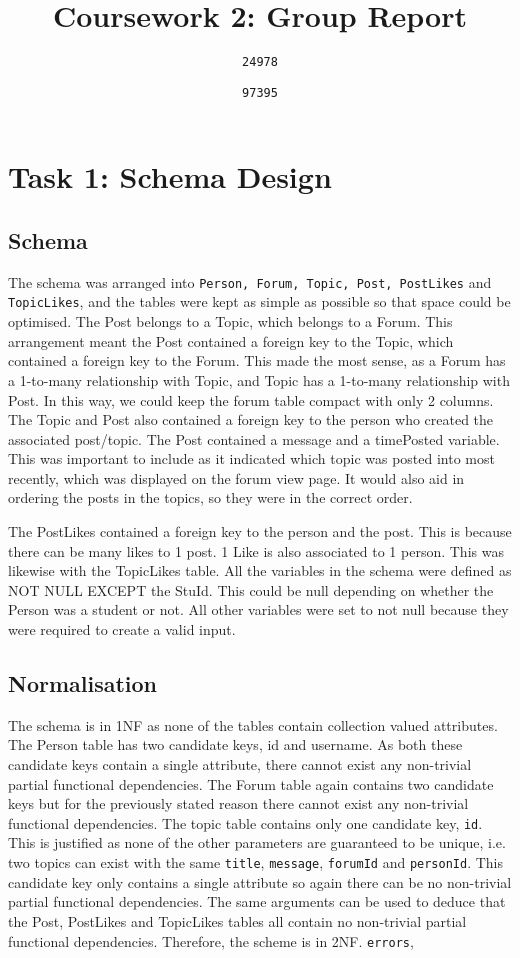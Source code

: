 \documentclass{article}
\begin{document}
\author{
	\texttt{24978}
	\and
	\texttt{97395}
}
\title{Coursework 2: Group Report}
\maketitle

\section*{Task 1: Schema Design}

\subsection*{Schema}

The schema was arranged into \texttt{Person, Forum, Topic, Post, PostLikes} and \texttt{TopicLikes}, and the tables were kept as simple as possible so that space could be optimised.
The Post belongs to a Topic, which belongs to a Forum. This arrangement meant the Post contained a foreign key to the Topic, which contained a foreign key to the Forum. This made the most sense, as a Forum has a 1-to-many relationship with Topic, and Topic has a 1-to-many relationship with Post. In this way, we could keep the forum table compact with only 2 columns.
The Topic and Post also contained a foreign key to the person who created the associated post/topic.
The Post contained a message and a timePosted variable. This was important to include as it indicated which topic was posted into most recently, which was displayed on the forum view page. It would also aid in ordering the posts in the topics, so they were in the correct order.

The PostLikes contained a foreign key to the person and the post. This is because there can be many likes to 1 post. 1 Like is also associated to 1 person.
This was likewise with the TopicLikes table.
All the variables in the schema were defined as NOT NULL EXCEPT the StuId. This could be null depending on whether the Person was a student or not. All other variables were set to not null because they were required to create a valid input.
\subsection*{Normalisation}

The schema is in 1NF as none of the tables contain collection valued attributes. 
The Person table has two candidate keys, id and username. As both these candidate keys contain a single attribute, there cannot exist any non-trivial partial functional dependencies. The Forum table again contains two candidate keys but for the previously stated reason there cannot exist any non-trivial functional dependencies. The topic table contains only one candidate key, \texttt{id}. This is justified as none of the other parameters are guaranteed to be unique, i.e. two topics can exist with the same \texttt{title}, \texttt{message}, \texttt{forumId} and \texttt{personId}. This candidate key only contains a single attribute so again there can be no non-trivial partial functional dependencies. The same arguments can be used to deduce that the Post, PostLikes and TopicLikes tables all contain no non-trivial partial functional dependencies. Therefore, the scheme is in 2NF.
\texttt{errors},
\newpage
\end{document}
